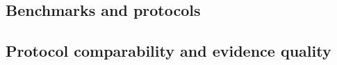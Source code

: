

\subsection{Benchmarks and protocols}
\label{sec:eval-bench}



\subsection{Protocol comparability and evidence quality}
\label{sec:eval-compare}



